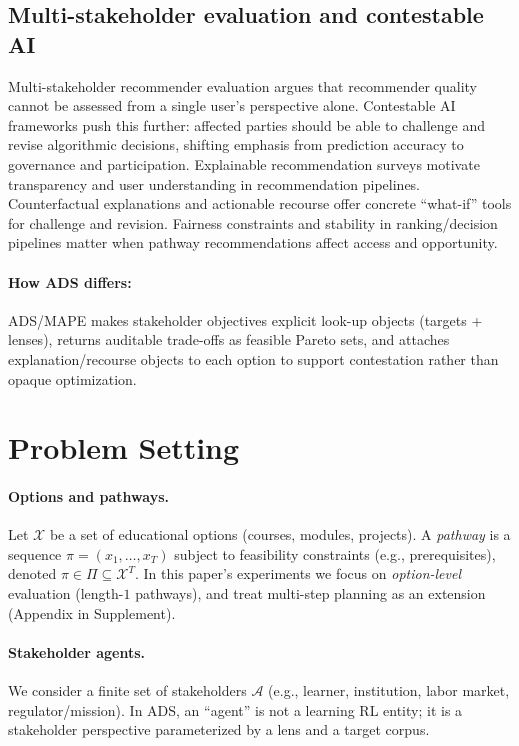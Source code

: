 \documentclass[sigconf,review]{acmart}
\newcommand{\ADS}{\textsc{ADS}\xspace}
\newcommand{\MAPE}{\textsc{MAPE}\xspace}
\begin{document}
\subsection{Multi-stakeholder evaluation and contestable AI}
Multi-stakeholder recommender evaluation argues that recommender quality cannot be assessed from a single user's perspective alone.\cite{abdollahpouri2020multistakeholder,burke2025mseval,ge2024trustworthyRS}
Contestable AI frameworks push this further: affected parties should be able to challenge and revise algorithmic decisions, shifting emphasis from prediction accuracy to governance and participation.\cite{aler2020contestable,alfrink2023contestable,dignum2025contesting}
Explainable recommendation surveys motivate transparency and user understanding in recommendation pipelines.\cite{zhang2020explainableRS}
Counterfactual explanations and actionable recourse offer concrete ``what-if'' tools for challenge and revision.\cite{wachter2017counterfactual,ustun2019recourse,robustx2025}
Fairness constraints and stability in ranking/decision pipelines matter when pathway recommendations affect access and opportunity.\cite{ekstrand2019fairness,dwork2012fairness,hardt2016equality,fairRankAgg2025,fairdas2024}
\paragraph{How ADS differs:} \ADS/\MAPE makes stakeholder objectives explicit look-up objects (targets + lenses), returns auditable trade-offs as feasible Pareto sets, and attaches explanation/recourse objects to each option to support contestation rather than opaque optimization.

\section{Problem Setting}
\label{sec:setting}
\paragraph{Options and pathways.}
Let $\mathcal{X}$ be a set of educational options (courses, modules, projects). A \emph{pathway} is a sequence $\pi=(x_1,\dots,x_T)$ subject to feasibility constraints (e.g., prerequisites), denoted $\pi\in\Pi\subseteq\mathcal{X}^T$. In this paper's experiments we focus on \emph{option-level} evaluation (length-$1$ pathways), and treat multi-step planning as an extension (Appendix in Supplement).

\paragraph{Stakeholder agents.}
We consider a finite set of stakeholders $\mathcal{A}$ (e.g., learner, institution, labor market, regulator/mission). In \ADS, an ``agent'' is not a learning RL entity; it is a stakeholder perspective parameterized by a lens and a target corpus.
\end{document}
